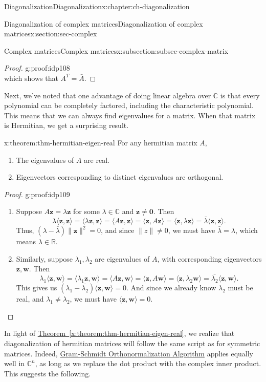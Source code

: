 \documentclass[oneside,10pt,]{book}
\newcommand{\xreffont}{\relax}
\numberwithin{equation}{section}
\newcommand{\R}{\mathbb{R}}
\newcommand{\C}{\mathbb{C}}
\newcommand{\len}[1]{\lVert #1\rVert}
\newcommand{\zz}{\mathbf{z}}
\newcommand{\ww}{\mathbf{w}}
\begin{document}
\begin{chapterptx}{Diagonalization}{}{Diagonalization}{}{}{x:chapter:ch-diagonalization}
\begin{sectionptx}{Diagonalization of complex matrices}{}{Diagonalization of complex matrices}{}{}{x:section:sec-complex}
\begin{subsectionptx}{Complex matrices}{}{Complex matrices}{}{}{x:subsection:subsec-complex-matrix}
\begin{proof}{}{g:proof:idp108}
\begin{equation*}
\end{equation*}
which shows that \(A^T=\bar{A}\).%
\end{proof}
Next, we've noted that one advantage of doing linear algebra over \(\C\) is that every polynomial can be completely factored, including the characteristic polynomial. This means that we can always find eigenvalues for a matrix. When that matrix is Hermitian, we get a surprising result.%
\begin{theorem}{}{}{x:theorem:thm-hermitian-eigen-real}%
For any hermitian matrix \(A\),%
\begin{enumerate}
\item{}The eigenvalues of \(A\) are real.%
\item{}Eigenvectors corresponding to distinct eigenvalues are orthogonal.%
\end{enumerate}
%
\end{theorem}
\begin{proof}{}{g:proof:idp109}
%
\begin{enumerate}
\item{}Suppose \(A\zz = \lambda\zz\) for some \(\lambda\in\C\) and \(\zz\neq \mathbf{0}\). Then%
\begin{equation*}
\lambda \langle \zz,\zz\rangle  = \langle \lambda\zz,\zz\rangle = \langle A\zz,\zz \rangle = \langle \zz, A\zz\rangle = \langle \zz,\lambda\zz\rangle = \bar{\lambda}\langle \zz,\zz\rangle\text{.}
\end{equation*}
Thus, \((\lambda-\bar{\lambda})\len{\zz}^2=0\), and since \(\len{z}\neq 0\), we must have \(\bar{\lambda}=\lambda\), which means \(\lambda\in\R\).%
\item{}Similarly, suppose \(\lambda_1,\lambda_2\) are eigenvalues of \(A\), with corresponding eigenvectors \(\zz,\ww\). Then%
\begin{equation*}
\lambda_1\langle \zz,\ww\rangle = \langle \lambda_1\zz,\ww\rangle = \langle A\zz,\ww\rangle =\langle \zz,A\ww\rangle = \langle \zz,\lambda_2\ww\rangle = \bar{\lambda_2}\langle\zz,\ww\rangle\text{.}
\end{equation*}
This gives us \((\lambda_1-\bar{\lambda_2})\langle \zz,\ww\rangle=0\). And since we already know \(\lambda_2\) must be real, and \(\lambda_1\neq \lambda_2\), we must have \(\langle \zz,\ww\rangle = 0\).%
\end{enumerate}
%
\end{proof}
In light of \hyperref[x:theorem:thm-hermitian-eigen-real]{Theorem~{\xreffont\ref{x:theorem:thm-hermitian-eigen-real}}}, we realize that diagonalization of hermitian matrices will follow the same script as for symmetric matrices. Indeed, \hyperref[x:theorem:thm-gram-schmidt]{Gram-Schmidt Orthonormalization Algorithm} applies equally well in \(\C^n\), as long as we replace the dot product with the complex inner product. This suggests the following.%

\end{subsectionptx}
\end{sectionptx}
\end{chapterptx}
\end{document}
